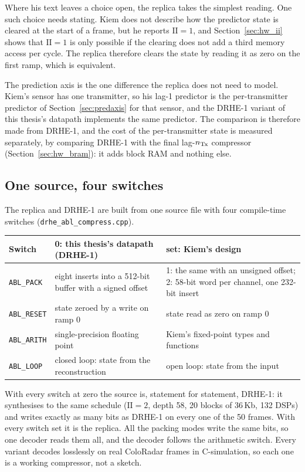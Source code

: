 \noindent
Where his text leaves a choice open, the replica takes the simplest reading.
One such choice needs stating. Kiem does not describe how the predictor state
is cleared at the start of a frame, but he reports $\mathrm{II} = 1$, and
Section~\ref{sec:hw_ii} shows that $\mathrm{II} = 1$ is only possible if the
clearing does not add a third memory access per cycle. The replica therefore
clears the state by reading it as zero on the first ramp, which is equivalent.

The prediction axis is the one difference the replica does not need to model.
Kiem's sensor has one transmitter, so his lag-1 predictor is the
per-transmitter predictor of Section~\ref{sec:predaxis} for that sensor, and
the DRHE-1 variant of this thesis's datapath implements the same predictor. The
comparison is therefore made from DRHE-1, and the cost of the per-transmitter
state is measured separately, by comparing DRHE-1 with the final lag-$n_{\mathrm{Tx}}$
compressor (Section~\ref{sec:hw_bram}): it adds block RAM and nothing else.

\subsection{One source, four switches}

The replica and DRHE-1 are built from one source file with four compile-time
switches (\texttt{drhe\_abl\_compress.cpp}).

\begin{center}
\small
\begin{tabular}{@{}lp{}p{}@{}}
\toprule
Switch & 0: this thesis's datapath (DRHE-1) & set: Kiem's design\\
\midrule
\texttt{ABL\_PACK}  & eight inserts into a 512-bit buffer with a signed offset &
1: the same with an unsigned offset; 2: 58-bit word per channel, one 232-bit
insert\\
\texttt{ABL\_RESET} & state zeroed by a write on ramp 0 & state read as zero on ramp 0\\
\texttt{ABL\_ARITH} & single-precision floating point & Kiem's fixed-point types and functions\\
\texttt{ABL\_LOOP}  & closed loop: state from the reconstruction & open loop: state from the input\\
\bottomrule
\end{tabular}
\end{center}

\noindent
With every switch at zero the source is, statement for statement, DRHE-1: it
synthesises to the same schedule ($\mathrm{II} = 2$, depth 58, 20 blocks of 36\,Kb,
132 DSPs) and writes exactly as many bits as DRHE-1 on every one of the 50
frames. With every switch set it is the replica. All the packing modes write the
same bits, so one decoder reads them all, and the decoder follows the
arithmetic switch. Every variant decodes losslessly on real ColoRadar frames in
C-simulation, so each one is a working compressor, not a sketch.

